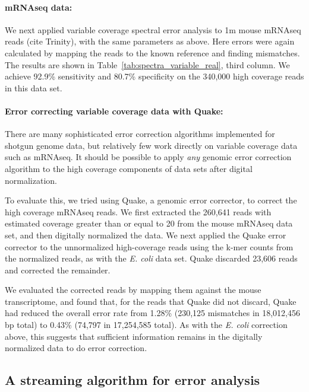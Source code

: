 \documentclass{article}
\begin{document}
\paragraph{mRNAseq data:}


We next applied variable coverage spectral error analysis to 1m mouse
mRNAseq reads (cite Trinity), with the same parameters as above.  Here
errors were again calculated by mapping the reads to the known
reference and finding mismatches. The results are shown in
Table~\ref{tab:spectra_variable_real}, third column.  We achieve
92.9\% sensitivity and 80.7\% specificity on the 340,000 high coverage
reads in this data set.

\paragraph{Error correcting variable coverage data with Quake:}


There are many sophisticated error correction algorithms implemented
for shotgun genome data, but relatively few work directly on variable
coverage data such as mRNAseq.  It should be possible to apply {\em
  any} genomic error correction algorithm to the high coverage
components of data sets after digital normalization.

To evaluate this, we tried using Quake, a genomic error corrector, to
correct the high coverage mRNAseq reads.  We first extracted the
260,641 reads with estimated coverage greater than or equal to 20 from
the mouse mRNAseq data set, and then digitally normalized the data.
We next applied the Quake error corrector to the unnormalized
high-coverage reads using the k-mer counts from the normalized reads,
as with the {\em E. coli} data set.  Quake discarded 23,606 reads and
corrected the remainder.

We evaluated the corrected reads by mapping them against the mouse
transcriptome, and found that, for the reads that Quake did not discard,
Quake had reduced the overall
error rate from 1.28\% (230,125 mismatches in 18,012,456 bp total) to
0.43\% (74,797 in 17,254,585 total).  As with the {\em E. coli} correction
above, this suggests that sufficient information remains in the digitally
normalized data to do error correction.

\subsection{A streaming algorithm for error analysis}
\end{document}
